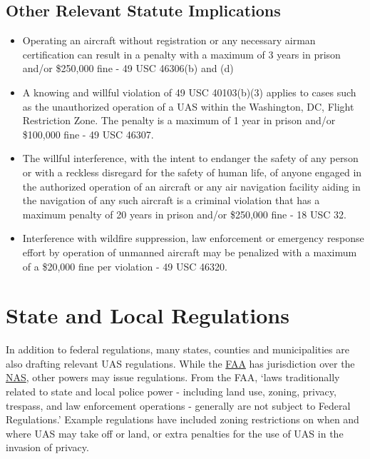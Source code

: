 \documentclass[
]{book}
\providecommand{\tightlist}{%
  \setlength{\itemsep}{0pt}\setlength{\parskip}{0pt}}
\begin{document}
\hypertarget{other-relevant-statute-implications}{%
\subsection{Other Relevant Statute Implications}\label{other-relevant-statute-implications}}

\begin{itemize}
\tightlist
\item
  Operating an aircraft without registration or any necessary airman certification can result in a penalty with a maximum of 3 years in prison and/or \$250,000 fine - 49 USC 46306(b) and (d)
\item
  A knowing and willful violation of 49 USC 40103(b)(3) applies to cases such as the unauthorized operation of a UAS within the Washington, DC, Flight Restriction Zone. The penalty is a maximum of 1 year in prison and/or \$100,000 fine - 49 USC 46307.
\item
  The willful interference, with the intent to endanger the safety of any person or with a reckless disregard for the safety of human life, of anyone engaged in the authorized operation of an aircraft or any air navigation facility aiding in the navigation of any such aircraft is a criminal violation that has a maximum penalty of 20 years in prison and/or \$250,000 fine - 18 USC 32.
\item
  Interference with wildfire suppression, law enforcement or emergency response effort by operation of unmanned aircraft may be penalized with a maximum of a \$20,000 fine per violation - 49 USC 46320.
\end{itemize}

\hypertarget{state-and-local-regulations}{%
\section{State and Local Regulations}\label{state-and-local-regulations}}

In addition to federal regulations, many states, counties and municipalities are also drafting relevant UAS regulations. While the \protect\hyperlink{FAA}{FAA} has jurisdiction over the \protect\hyperlink{NAS}{NAS}, other powers may issue regulations. From the FAA, `laws traditionally related to state and local police power - including land use, zoning, privacy, trespass, and law enforcement operations - generally are not subject to Federal Regulations.' Example regulations have included zoning restrictions on when and where UAS may take off or land, or extra penalties for the use of UAS in the invasion of privacy.
\end{document}
